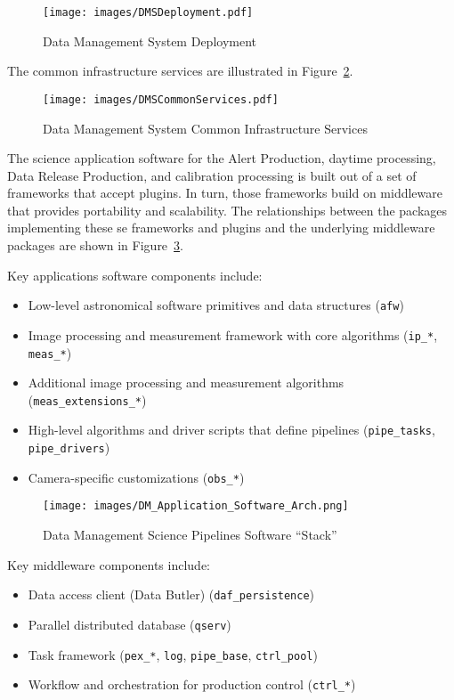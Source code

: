 \documentclass[DM,toc]{lsstdoc}
\begin{document}
\begin{figure}
\centering
\texttt{[image: images/DMSDeployment.pdf]}
\caption{Data Management System Deployment}
\label{fig:deployment}
\end{figure}

The common infrastructure services are illustrated in Figure~\ref{fig:commonservices}.

\begin{figure}
\centering
\texttt{[image: images/DMSCommonServices.pdf]}
\caption{Data Management System Common Infrastructure Services}
\label{fig:commonservices}
\end{figure}

The science application software for the Alert Production, daytime
processing, Data Release Production, and calibration processing is built
out of a set of frameworks that accept plugins. In turn, those
frameworks build on middleware that provides portability and
scalability.  The relationships between the packages implementing
these se frameworks and plugins and the underlying middleware packages
are shown in Figure~\ref{fig:scipi}.

Key applications software components include:
\begin{itemize}
\item
  Low-level astronomical software primitives and data structures
  (\texttt{afw})
\item
  Image processing and measurement framework with core algorithms
  (\texttt{ip\_*}, \texttt{meas\_*})
\item
  Additional image processing and measurement algorithms
  (\texttt{meas\_extensions\_*})
\item
  High-level algorithms and driver scripts that define pipelines
  (\texttt{pipe\_tasks}, \texttt{pipe\_drivers})
\item
  Camera-specific customizations (\texttt{obs\_*})
\end{itemize}

\begin{figure}
\centering
\texttt{[image: images/DM\_Application\_Software\_Arch.png]}
\caption{Data Management Science Pipelines Software ``Stack''}
\label{fig:scipi}
\end{figure}

Key middleware components include:
\begin{itemize}
\item
  Data access client (Data Butler) (\texttt{daf\_persistence})
\item
  Parallel distributed database (\texttt{qserv})
\item
  Task framework (\texttt{pex\_*}, \texttt{log}, \texttt{pipe\_base},
  \texttt{ctrl\_pool})
\item
  Workflow and orchestration for production control (\texttt{ctrl\_*})
\end{itemize}
\end{document}
